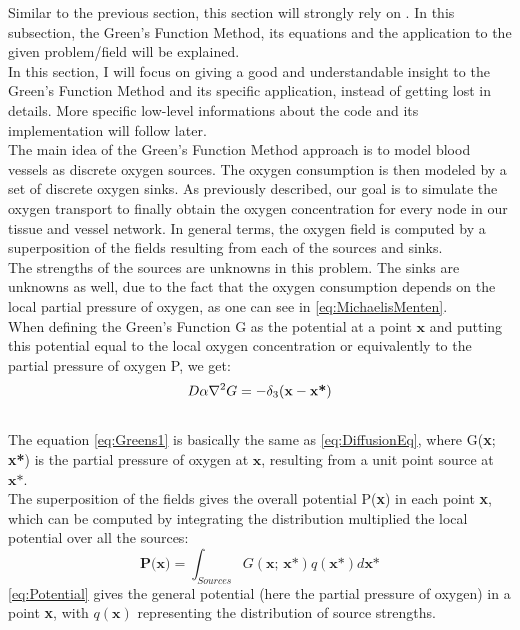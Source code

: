  Similar to the previous section, this section will strongly rely on \cite{Secomb2004}. In this subsection, the Green's Function Method, its equations and the application to the given problem/field will be explained.
\\In this section, I will focus on giving a good and understandable insight to the Green's Function Method and its specific application, instead of getting lost in details. More specific low-level informations about the code and its implementation will follow later.
\\The main idea of the Green's Function Method approach is to model blood vessels as discrete oxygen sources. The oxygen consumption is then modeled by a set of discrete oxygen sinks. As previously described, our goal is to simulate the oxygen transport to finally obtain the oxygen concentration for every node in our tissue and vessel network. In general terms, the oxygen field is computed by a superposition of the fields resulting from each of the sources and sinks.
\\The strengths of the sources are unknowns in this problem. The sinks are unknowns as well, due to the fact that the oxygen consumption depends on the local partial pressure of oxygen, as one can see in \ref{eq:MichaelisMenten}.
%
\\When defining the Green's Function G as the potential at a point $\textbf{x}$ and putting this potential equal to the local oxygen concentration or equivalently to the partial pressure of oxygen P, we get:
\begin{equation}
\\D\alpha\nabla^2G = - \delta_3 
( \textbf{x} - \textbf{x*} )
\label{eq:Greens1}
\end{equation}
\\The equation \ref{eq:Greens1} is basically the same as \ref{eq:DiffusionEq}, where G(\textbf{x}; \textbf{x*}) is the partial pressure of oxygen at $\textbf{x}$, resulting from a unit point source at $\textbf{x*}$.
%
\\The superposition of the fields gives the overall potential P(\textbf{x}) in each point \textbf{x}, which can be computed by integrating the distribution multiplied the local potential over all the sources:
\begin{equation}
\textbf{P(x)} = \int_{Sources} G(\textbf{x; x*})q(\textbf{x*})d\textbf{x*}
\label{eq:Potential}
\end{equation}
\ref{eq:Potential} gives the general potential (here the partial pressure of oxygen) in a point \textbf{x}, with $q(\textbf{x})$ representing the distribution of source strengths.

